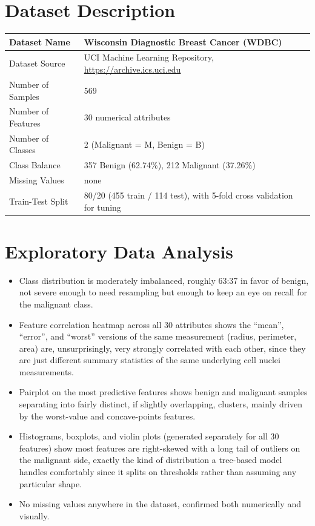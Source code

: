 \documentclass[12pt,a4paper]{article}
\begin{document}
\section{Dataset Description}
\begin{longtable}{|p{6cm}|p{8cm}|}
\hline
Dataset Name & Wisconsin Diagnostic Breast Cancer (WDBC) \\ \hline
Dataset Source & UCI Machine Learning Repository, \url{https://archive.ics.uci.edu} \\ \hline
Number of Samples & 569 \\ \hline
Number of Features & 30 numerical attributes \\ \hline
Number of Classes & 2 (Malignant = M, Benign = B) \\ \hline
Class Balance & 357 Benign (62.74\%), 212 Malignant (37.26\%) \\ \hline
Missing Values & none \\ \hline
Train-Test Split & 80/20 (455 train / 114 test), with 5-fold cross validation for tuning \\ \hline
\end{longtable}

\section{Exploratory Data Analysis}
\begin{itemize}
\item Class distribution is moderately imbalanced, roughly 63:37 in favor of benign, not severe
enough to need resampling but enough to keep an eye on recall for the malignant class.
\item Feature correlation heatmap across all 30 attributes shows the ``mean'', ``error'', and
``worst'' versions of the same measurement (radius, perimeter, area) are, unsurprisingly, very
strongly correlated with each other, since they are just different summary statistics of the same
underlying cell nuclei measurements.
\item Pairplot on the most predictive features shows benign and malignant samples separating into
fairly distinct, if slightly overlapping, clusters, mainly driven by the worst-value and
concave-points features.
\item Histograms, boxplots, and violin plots (generated separately for all 30 features) show most
features are right-skewed with a long tail of outliers on the malignant side, exactly the kind of
distribution a tree-based model handles comfortably since it splits on thresholds rather than
assuming any particular shape.
\item No missing values anywhere in the dataset, confirmed both numerically and visually.
\end{itemize}
\end{document}
